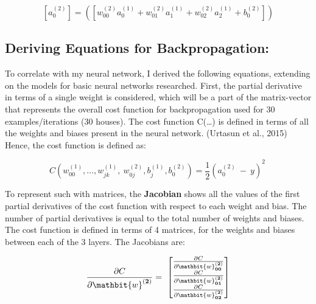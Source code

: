 \documentclass[12pt,a4paper]{article}
\begin{document}
\begin{equation}
\left[a_0^{\left(2\right)}\right]=\left(\left[w_{00}^{\left(2\right)}a_0^{\left(1\right)}+w_{01}^{\left(2\right)}a_1^{\left(1\right)}+w_{02}^{\left(2\right)}a_2^{\left(1\right)}+b_0^{\left(2\right)}\right]\right)
\end{equation}

\subsection{Deriving Equations for Backpropagation:}
To correlate with my neural network, I derived the following equations, extending on the models for basic neural networks researched. First, the partial derivative in terms of a single weight is considered, which will be a part of the matrix-vector that represents the overall cost function for backpropagation used for 30 examples/iterations (30 houses). The cost function C(\ldots) is defined in terms of all the weights and biases present in the neural network. (Urtasun et al., 2015) Hence, the cost function is defined as: 

\begin{equation}
C\left(w_{00}^{\left(1\right)},\ldots,w_{jk}^{\left(1\right)},\ w_{0j}^{\left(2\right)},b_j^{\left(1\right)},b_0^{\left(2\right)}\right)={\frac{1}{2}\left(a_0^{\left(2\right)}\ -\ y\right)}^2\ 
\end{equation}


 To represent such with matrices, the \textbf{Jacobian} shows all the values of the first partial derivatives of the cost function with respect to each weight and bias. The number of partial derivatives is equal to the total number of weights and biases. The cost function is defined in terms of 4 matrices, for the weights and biases between each of the 3 layers.  The Jacobians are:
 
\begin{equation}
    \frac{\partial C}{\partial\mathbit{w}^{\left(\mathbf{2}\right)}}=\ \left[\begin{matrix}\frac{\partial C}{\partial\mathbit{w}_{\mathbf{00}}^{\left(\mathbf{2}\right)}}\\\frac{\partial C}{\partial\mathbit{w}_{\mathbf{01}}^{\left(\mathbf{2}\right)}}\\\frac{\partial C}{\partial\mathbit{w}_{\mathbf{02}}^{\left(\mathbf{2}\right)}}\\\end{matrix}\right]
\end{equation}
\end{document}
